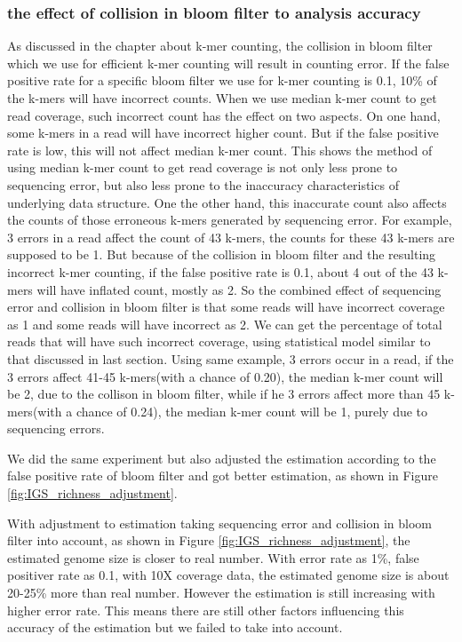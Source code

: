 \subsubsection{the effect of collision in bloom filter to analysis accuracy}
As discussed in the chapter about k-mer counting, the collision in bloom filter
which we use for efficient k-mer counting will result in counting error. If the
false positive rate for a specific bloom filter we use for k-mer counting is
0.1, 10\% of the k-mers will have incorrect counts. When we use median k-mer
count to get read coverage, such incorrect count has the effect on two aspects.
On one hand, some k-mers in a read will have incorrect higher count. But if the
 false
positive rate is low, this will not affect median k-mer count. This shows the
method of using median k-mer count to get read coverage is not only less prone
to sequencing error, but also less prone to the inaccuracy characteristics of
underlying data structure. One the other hand, this inaccurate count also
affects the counts of those erroneous k-mers generated by sequencing error. For
example, 3 errors in a read affect the count of 43 k-mers, the counts for these
43 k-mers are supposed to be 1. But because of the collision in bloom filter
and the resulting incorrect k-mer counting, if the false positive rate is 0.1,
about 4 out of the 43 k-mers will have inflated count, mostly as 2. So the
combined effect of sequencing error and collision in bloom filter is that some
reads will have incorrect coverage as 1 and some reads will have incorrect as
2. We can get the percentage of total reads that will have such incorrect
coverage, using statistical model similar to that discussed in last section.
Using same example, 3 errors occur in a read, if the 3 errors affect 41-45
k-mers(with a chance of 0.20), the median k-mer count will be 2, due to the 
collison in bloom filter, while if he 3 errors affect more than 45 k-mers(with 
a chance of 0.24), the median k-mer count will be 1, purely due to sequencing 
errors. 

We did the same experiment but also adjusted the estimation according to the 
false positive rate of bloom filter and got better estimation, as shown in
Figure \ref{fig:IGS_richness_adjustment}.

With adjustment to estimation taking sequencing error and collision in bloom
filter into account, as shown in Figure \ref{fig:IGS_richness_adjustment}, the 
estimated genome size is closer to real number. With error rate as 1\%,
false positiver rate as 0.1, with 10X coverage data, the estimated genome size
is about 20-25\% more than real number. However the estimation is still 
increasing with higher
error rate. This means there are still other factors influencing this
accuracy of the estimation but we failed to take into account.

